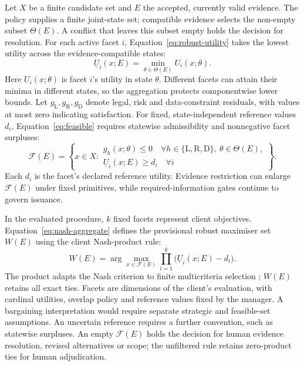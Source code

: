 \documentclass[oneside,10pt,english]{swissi}
\begin{document}
Let $X$ be a finite candidate set and $E$ the accepted, currently valid evidence. The policy supplies a finite joint-state set; compatible evidence selects the non-empty subset $\Theta(E)$. A conflict that leaves this subset empty holds the decision for resolution. For each active facet $i$, Equation~\eqref{eq:robust-utility} takes the lowest utility across the evidence-compatible states:
\begin{equation}
 \underline U_i(x;E)=\min_{\theta\in\Theta(E)}U_i(x;\theta).
 \label{eq:robust-utility}
\end{equation}
Here $U_i(x;\theta)$ is facet $i$'s utility in state $\theta$. Different facets can attain their minima in different states, so the aggregation protects componentwise lower bounds. Let $g_{\mathrm L},g_{\mathrm R},g_{\mathrm D}$ denote legal, risk and data-constraint residuals, with values at most zero indicating satisfaction. For fixed, state-independent reference values $d_i$, Equation~\eqref{eq:feasible} requires statewise admissibility and nonnegative facet surpluses:
\begin{equation}
 \mathcal F(E)=\left\{x\in X:
 \begin{array}{l}
 g_h(x;\theta)\le0\quad\forall h\in\{\mathrm L,\mathrm R,\mathrm D\},\ \theta\in\Theta(E),\\
 \underline U_i(x;E)\ge d_i\quad\forall i
 \end{array}\right\}.
 \label{eq:feasible}
\end{equation}
Each $d_i$ is the facet's declared reference utility. Evidence restriction can enlarge $\mathcal F(E)$ under fixed primitives, while required-information gates continue to govern issuance.

In the evaluated procedure, $k$ fixed facets represent client objectives. Equation~\eqref{eq:nash-aggregate} defines the provisional robust maximiser set $W(E)$ using the client Nash-product rule:
\begin{equation}
 W(E)=\arg\max_{x\in\mathcal F(E)}
 \prod_{i=1}^{k}\bigl(\underline U_i(x;E)-d_i\bigr).
 \label{eq:nash-aggregate}
\end{equation}
The product adapts the Nash criterion to finite multicriteria selection \parencite{nash1950bargaining}; $W(E)$ retains all exact ties. Facets are dimensions of the client's evaluation, with cardinal utilities, overlap policy and reference values fixed by the manager. A bargaining interpretation would require separate strategic and feasible-set assumptions. An uncertain reference requires a further convention, such as statewise surpluses. An empty $\mathcal F(E)$ holds the decision for human evidence resolution, revised alternatives or scope; the unfiltered rule retains zero-product ties for human adjudication.
\end{document}
